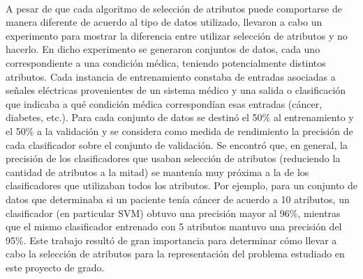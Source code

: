 \paragraph{}A pesar de que cada algoritmo de selección de atributos puede comportarse de manera diferente de acuerdo al tipo de datos utilizado, \citet{fs-survey} llevaron a cabo un experimento para mostrar la diferencia entre utilizar selección de atributos y no hacerlo.
En dicho experimento se generaron conjuntos de datos, cada uno correspondiente a una condición médica, teniendo potencialmente distintos atributos.
Cada instancia de entrenamiento constaba de entradas asociadas a señales eléctricas provenientes de un sistema médico y una salida o clasificación que indicaba a qué condición médica correspondían esas entradas (cáncer, diabetes, etc.).
Para cada conjunto de datos se destinó el 50\% al entrenamiento y el 50\% a la validación y se considera como medida de rendimiento la precisión de cada clasificador sobre el conjunto de validación.
Se encontró que, en general, la precisión de los clasificadores que usaban selección de atributos (reduciendo la cantidad de atributos a la mitad) se mantenía muy próxima a la de los clasificadores que utilizaban todos los atributos.
Por ejemplo, para un conjunto de datos que determinaba si un paciente tenía cáncer de acuerdo a 10 atributos, un clasificador (en particular SVM) obtuvo una precisión mayor al 96\%, mientras que el mismo clasificador entrenado con 5 atributos mantuvo una precisión del 95\%.
Este trabajo resultó de gran importancia para determinar cómo llevar a cabo la selección de atributos para la representación del problema estudiado en este proyecto de grado.

